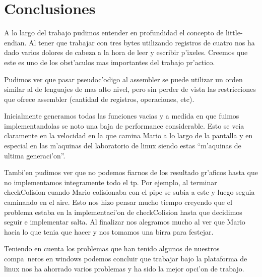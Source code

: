 \section{Conclusiones}
A lo largo del trabajo pudimos entender en profundidad el concepto de little-endian. Al tener que trabajar con tres bytes utilizando registros de cuatro nos ha dado varios dolores de cabeza a la hora de leer y escribir p'ixeles. 
Creemos que este es uno de los obst'aculos mas importantes del trabajo pr'actico.

Pudimos ver que pasar pseudoc'odigo al assembler se puede utilizar un orden similar al de lenguajes de mas alto nivel, pero sin perder de vista las restricciones que ofrece assembler (cantidad de registros, operaciones, etc).

Inicialmente generamos todas las funciones vacias y a medida en que fuimos implementandolas se noto una baja de performance considerable. Esto se veia claramente en la velocidad en la que camina Mario a lo largo de la pantalla y en especial en las m'aquinas del laboratorio de linux siendo estas ``m'aquinas de ultima generaci'on''.

Tambi'en pudimos ver que no podemos fiarnos de los resultado gr'aficos hasta que no implementamos integramente todo el tp. Por ejemplo, al terminar checkColision cuando Mario colisionaba con el pipe se subia a este y luego seguia caminando en el aire. Esto nos hizo pensar mucho tiempo creyendo que el problema estaba en la implementaci'on de checkColision hasta que decidimos seguir e implementar salta. Al finalizar nos alegramos mucho al ver que Mario hacia lo que tenia que hacer y nos tomamos una birra para festejar.

Teniendo en cuenta los problemas que han tenido algunos de nuestros compa~neros en windows podemos concluir que trabajar bajo la plataforma de linux nos ha ahorrado varios problemas y ha sido la mejor opci'on de trabajo.

